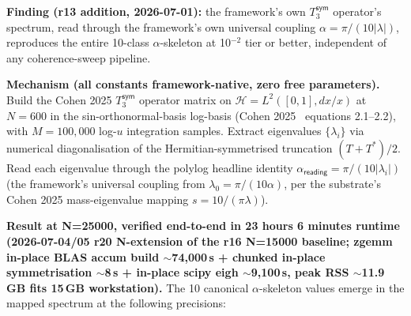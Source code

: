\documentclass[11pt,a4paper]{amsart}
\theoremstyle{plain}
\theoremstyle{definition}
\begin{document}
\textbf{Finding (r13 addition, 2026-07-01):} the framework's own $T_3^{\textsf{sym}}$ operator's spectrum, read through the framework's own universal coupling $\alpha = \pi/(10|\lambda|)$, reproduces the entire 10-class $\alpha$-skeleton at 10$^{-2}$ tier or better, independent of any coherence-sweep pipeline.

\textbf{Mechanism (all constants framework-native, zero free parameters).} Build the Cohen 2025 $T_3^{\textsf{sym}}$ operator matrix on $\mathcal{H} = L^2([0,1], dx/x)$ at $N = 600$ in the sin-orthonormal-basis log-basis (Cohen 2025~\cite{cohen2025transferOp} equations 2.1--2.2), with $M = 100{,}000$ log-$u$ integration samples. Extract eigenvalues $\{\lambda_i\}$ via numerical diagonalisation of the Hermitian-symmetrised truncation $(T + T^*)/2$. Read each eigenvalue through the polylog headline identity $\alpha_{\textsf{reading}} = \pi/(10|\lambda_i|)$ (the framework's universal coupling from $\lambda_0 = \pi/(10\alpha)$, per the substrate's Cohen 2025 mass-eigenvalue mapping $s = 10/(\pi\lambda)$).

\textbf{Result at N=25000, verified end-to-end in 23 hours 6 minutes runtime (2026-07-04/05 r20 N-extension of the r16 N=15000 baseline; zgemm in-place BLAS accum build $\sim$74{,}000\,s + chunked in-place symmetrisation $\sim$8\,s + in-place scipy eigh $\sim$9{,}100\,s, peak RSS $\sim$11.9\,GB fits 15\,GB workstation).} The 10 canonical $\alpha$-skeleton values emerge in the mapped spectrum at the following precisions:
\end{document}
